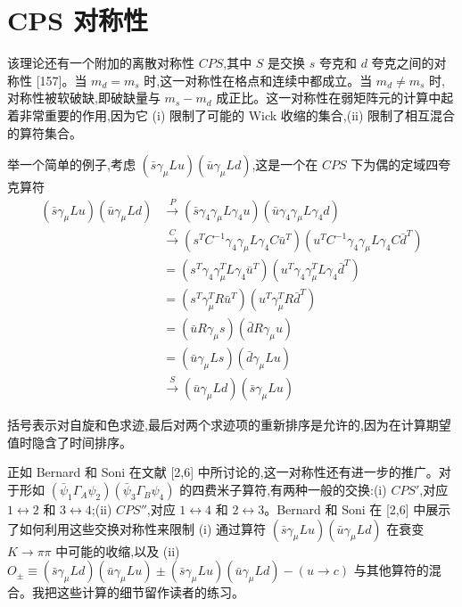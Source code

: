 \section{CPS 对称性}

该理论还有一个附加的离散对称性 $CPS$,其中 $S$ 是交换 $s$ 夸克和 $d$ 夸克之间的对称性 [157]。当 $m_d = m_s$ 时,这一对称性在格点和连续中都成立。当 $m_d \neq m_s$ 时,对称性被软破缺,即破缺量与 $m_s - m_d$ 成正比。这一对称性在弱矩阵元的计算中起着非常重要的作用,因为它 (i) 限制了可能的 Wick 收缩的集合,(ii) 限制了相互混合的算符集合。

举一个简单的例子,考虑 $(\bar{s}\gamma_\mu Lu)(\bar{u}\gamma_\mu Ld)$,这是一个在 $CPS$ 下为偶的定域四夸克算符
\begin{equation}
\begin{aligned}
(\bar{s}\gamma_\mu Lu)(\bar{u}\gamma_\mu Ld)
&\xrightarrow{P} (\bar{s}\gamma_4\gamma_\mu L\gamma_4 u)(\bar{u}\gamma_4\gamma_\mu L\gamma_4 d)\\
&\xrightarrow{C} (s^T C^{-1}\gamma_4\gamma_\mu L\gamma_4 C\bar{u}^T)(u^T C^{-1}\gamma_4\gamma_\mu L\gamma_4 C\bar{d}^T)\\
&= (s^T\gamma_4\gamma_\mu^T L\gamma_4\bar{u}^T)(u^T\gamma_4\gamma_\mu^T L\gamma_4\bar{d}^T)\\
&= (s^T\gamma_\mu^T R\bar{u}^T)(u^T\gamma_\mu^T R\bar{d}^T)\\
&= (\bar{u}R\gamma_\mu s)(\bar{d}R\gamma_\mu u)\\
&= (\bar{u}\gamma_\mu Ls)(\bar{d}\gamma_\mu Lu)\\
&\xrightarrow{S} (\bar{u}\gamma_\mu Ld)(\bar{s}\gamma_\mu Lu)
\end{aligned}
\end{equation}

括号表示对自旋和色求迹,最后对两个求迹项的重新排序是允许的,因为在计算期望值时隐含了时间排序。

正如 Bernard 和 Soni 在文献 [2,6] 中所讨论的,这一对称性还有进一步的推广。对于形如 $(\bar{\psi}_1\Gamma_A\psi_2)(\bar{\psi}_3\Gamma_B\psi_4)$ 的四费米子算符,有两种一般的交换:(i) $CPS'$,对应 $1 \leftrightarrow 2$ 和 $3 \leftrightarrow 4$;(ii) $CPS''$,对应 $1 \leftrightarrow 4$ 和 $2 \leftrightarrow 3$。Bernard 和 Soni 在 [2,6] 中展示了如何利用这些交换对称性来限制 (i) 通过算符 $(\bar{s}\gamma_\mu Lu)(\bar{u}\gamma_\mu Ld)$ 在衰变 $K \to \pi\pi$ 中可能的收缩,以及 (ii) $O_\pm \equiv (\bar{s}\gamma_\mu Ld)(\bar{u}\gamma_\mu Lu) \pm (\bar{s}\gamma_\mu Lu)(\bar{u}\gamma_\mu Ld) - (u \to c)$ 与其他算符的混合。我把这些计算的细节留作读者的练习。
